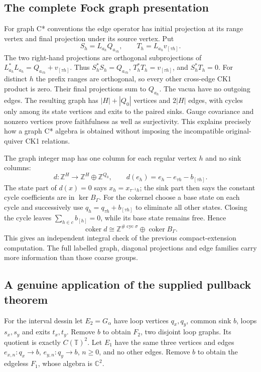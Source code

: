 \documentclass[11pt]{article}
\theoremstyle{definition}\newtheorem{definition}[theorem]{Definition}
\theoremstyle{remark}\newtheorem{remark}[theorem]{Remark}
\newcommand{\C}{\mathbb C}\newcommand{\Z}{\mathbb Z}\newcommand{\R}{\mathbb R}
\begin{document}
\subsection{The complete Fock graph presentation}
For graph C* conventions the edge operator has initial projection at its range vertex and final projection under its source vertex. Put
\[
 S_h=L_{a_h}Q_{a_{\tau h}},\qquad T_h=L_{a_h}v_{[\tau h]}.
\]
The two right-hand projections are orthogonal subprojections of $L_{a_h}^*L_{a_h}=Q_{a_{\tau h}}+v_{[\tau h]}$. Thus $S_h^*S_h=Q_{a_{\tau h}}$, $T_h^*T_h=v_{[\tau h]}$, and $S_h^*T_h=0$. For distinct $h$ the prefix ranges are orthogonal, so every other cross-edge CK1 product is zero. Their final projections sum to $Q_{a_h}$. The vacua have no outgoing edges. The resulting graph has $|H|+|Q_0|$ vertices and $2|H|$ edges, with cycles only among its state vertices and exits to the paired sinks. Gauge covariance and nonzero vertices prove faithfulness as well as surjectivity. This explains precisely how a graph C* algebra is obtained without imposing the incompatible original-quiver CK1 relations.

The graph integer map has one column for each regular vertex $h$ and no sink columns:
\[
 d:\Z^H\longrightarrow\Z^H\oplus\Z^{Q_0},\qquad
 d(e_h)=e_h-e_{\tau h}-b_{[\tau h]}.
\]
The state part of $d(x)=0$ says $x_h=x_{\tau^{-1}h}$; the sink part then says the constant cycle coefficients are in $\ker B_\Gamma$. For the cokernel choose a base state on each cycle and successively use $q_h=q_{\tau h}+b_{[\tau h]}$ to eliminate all other states. Closing the cycle leaves $\sum_{h\in c}b_{[h]}=0$, while its base state remains free. Hence
\[
 \operatorname{coker}d\cong\Z^{\#\operatorname{cyc}\sigma}\oplus\operatorname{coker}B_\Gamma.
\]
This gives an independent integral check of the previous compact-extension computation. The full labelled graph, diagonal projections and edge families carry more information than those coarse groups.

\subsection{A genuine application of the supplied pullback theorem}
For the interval dessin let $E_2=G_\alpha$ have loop vertices $q_x,q_y$, common sink $b$, loops $s_x,s_y$ and exits $t_x,t_y$. Remove $b$ to obtain $F_2$, two disjoint loop graphs. Its quotient is exactly $C(\mathbb T)^2$. Let $E_1$ have the same three vertices and edges $e_{x,n}:q_x\to b$, $e_{y,n}:q_y\to b$, $n\ge0$, and no other edges. Remove $b$ to obtain the edgeless $F_1$, whose algebra is $\C^2$.
\end{document}
